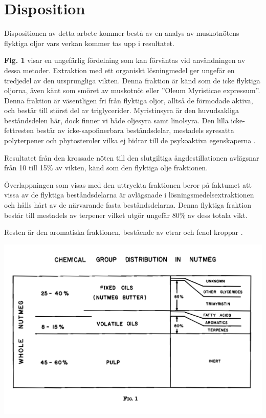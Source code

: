 \documentclass{theme/franska}
\begin{document}
\pagebreak

\section{Disposition}

Dispositionen av detta arbete kommer bestå av en analys av muskotnötens flyktiga oljor
vars verkan kommer tas upp i resultatet.

\textbf{Fig. 1} visar en ungefärlig fördelning som kan förväntas vid användningen av dessa metoder. Extraktion med ett organiskt lösningmedel ger ungefär en tredjedel av den ursprungliga vikten. Denna fraktion är känd som de icke flyktiga oljorna, även känt som smöret av muskotnöt eller ''Oleum Myristicae expressum''. Denna fraktion är väsentligen fri från flyktiga oljor, alltså de förmodade aktiva, och består till störst del av triglycerider. Myristinsyra är den huvudsakliga beståndsdelen här, dock finner vi både oljesyra samt linolsyra. Den lilla icke-fettresten består av icke-sapofinerbara beståndsdelar, mestadels syresatta polyterpener och phytosteroler vilka ej bidrar till de psykoaktiva egenskaperna \cite{shulgin1967chemistry}.

Resultatet från den krossade nöten till den slutgiltiga ångdestillationen avlägsnar från 10 till 15\% av vikten, känd som den flyktiga olje fraktionen.

Överlappningen som visas med den uttryckta fraktionen beror på faktumet att vissa av de flyktiga beståndsdelarna är avlägsnade i lösningsmedelsextraktionen och hålls hårt av de närvarande fasta beståndsdelarna.
Denna flyktiga fraktion består till mestadels av terpener vilket utgör ungefär 80\% av dess totala vikt.

Resten är den aromatiska fraktionen, bestående av etrar och fenol kroppar \cite{shulgin1967chemistry}.


\includegraphics[scale=0.122]{Figure1}
\end{document}
